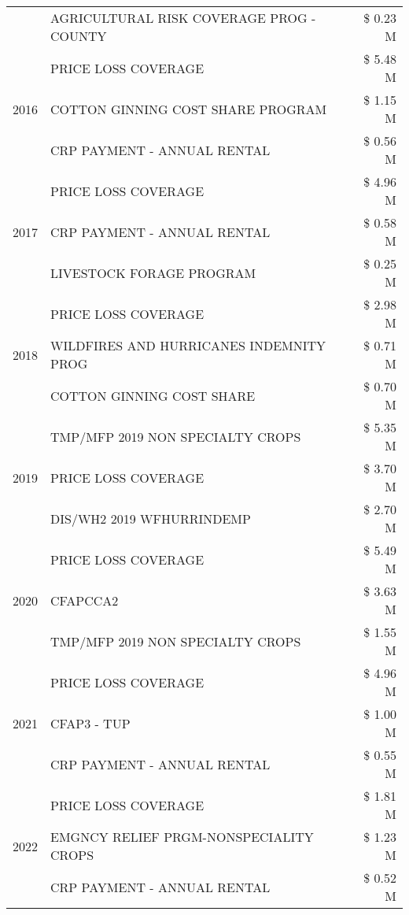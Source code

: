 \begin{tabular}{llr}
 & AGRICULTURAL RISK COVERAGE PROG - COUNTY & \$ 0.23 M \\
\cline{1-3}
\multirow[t]{3}{*}{2016} & PRICE LOSS COVERAGE & \$ 5.48 M \\
 & COTTON GINNING COST SHARE PROGRAM & \$ 1.15 M \\
 & CRP PAYMENT - ANNUAL RENTAL & \$ 0.56 M \\
\cline{1-3}
\multirow[t]{3}{*}{2017} & PRICE LOSS COVERAGE & \$ 4.96 M \\
 & CRP PAYMENT - ANNUAL RENTAL & \$ 0.58 M \\
 & LIVESTOCK FORAGE PROGRAM & \$ 0.25 M \\
\cline{1-3}
\multirow[t]{3}{*}{2018} & PRICE LOSS COVERAGE & \$ 2.98 M \\
 & WILDFIRES AND HURRICANES INDEMNITY PROG & \$ 0.71 M \\
 & COTTON GINNING COST SHARE & \$ 0.70 M \\
\cline{1-3}
\multirow[t]{3}{*}{2019} & TMP/MFP 2019 NON SPECIALTY CROPS & \$ 5.35 M \\
 & PRICE LOSS COVERAGE & \$ 3.70 M \\
 & DIS/WH2 2019 WFHURRINDEMP & \$ 2.70 M \\
\cline{1-3}
\multirow[t]{3}{*}{2020} & PRICE LOSS COVERAGE & \$ 5.49 M \\
 & CFAPCCA2 & \$ 3.63 M \\
 & TMP/MFP 2019 NON SPECIALTY CROPS & \$ 1.55 M \\
\cline{1-3}
\multirow[t]{3}{*}{2021} & PRICE LOSS COVERAGE & \$ 4.96 M \\
 & CFAP3 - TUP & \$ 1.00 M \\
 & CRP PAYMENT - ANNUAL RENTAL & \$ 0.55 M \\
\cline{1-3}
\multirow[t]{3}{*}{2022} & PRICE LOSS COVERAGE & \$ 1.81 M \\
 & EMGNCY RELIEF PRGM-NONSPECIALITY CROPS & \$ 1.23 M \\
 & CRP PAYMENT - ANNUAL RENTAL & \$ 0.52 M \\
\cline{1-3}
\bottomrule
\end{tabular}
